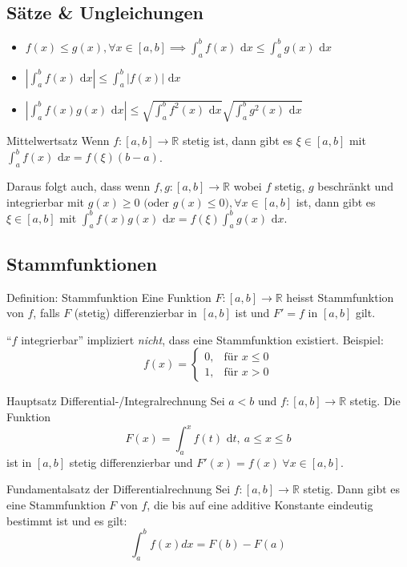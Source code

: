 \documentclass[a4paper,10pt]{article}
\def\R{\mathbb{R}}
\def\dx{\text{ d}x}
\begin{document}
\subsection{Sätze \& Ungleichungen}
\begin{itemize}
 \item $f(x) \le g(x), \forall x \in [a,b] \implies \int_a^b f(x) \dx \le \int_a^b g(x) \dx$
 \item $\left|\int_a^b f(x) \dx\right| \le \int_a^b |f(x)| \dx$
 \item $\left|\int_a^b f(x) g(x) \dx \right| \le \sqrt{\int_a^b f^2(x) \dx} \sqrt{\int_a^b g^2(x) \dx}$
\end{itemize}

\begin{mainbox}{Mittelwertsatz}
 Wenn $f: [a,b] \to \R$ stetig ist, dann gibt es $\xi \in [a,b]$ mit $\int_a^b f(x) \dx = f(\xi) (b-a)$.
\end{mainbox}
Daraus folgt auch, dass wenn $f,g: [a,b] \to \R$ wobei $f$ stetig, $g$ beschränkt und integrierbar mit $g(x) \ge 0 \text{ (oder }g(x) \le 0\text{)}, \forall x \in [a,b]$ ist, dann gibt es $\xi \in [a,b]$ mit $\int_a^b f(x)g(x) \dx = f(\xi) \int_a^b g(x) \dx$.

\subsection{Stammfunktionen}
\begin{subbox}{Definition: Stammfunktion}
 Eine Funktion $F: [a,b] \to \R$ heisst Stammfunktion von $f$, falls $F$ (stetig) differenzierbar in $[a,b]$ ist und $F' = f$ in $[a,b]$ gilt.
\end{subbox}
``$f$ integrierbar'' impliziert \textit{nicht}, dass eine Stammfunktion existiert. Beispiel:
$$
 f(x) = \begin{cases}
        0, & \text{für } x \le 0 \\
        1, & \text{für } x > 0
        \end{cases}
$$

\begin{mainbox}{Hauptsatz Differential-/Integralrechnung}
 Sei $a<b$ und $f: [a,b] \to \R$ stetig. Die Funktion 
 $$F(x) = \int_a^x f(t) \text{ d}t, \ a \le x \le b$$
 ist in $[a,b]$ stetig differenzierbar und $F'(x) = f(x) \ \forall x \in [a,b]$.
\end{mainbox}

\begin{mainbox}{Fundamentalsatz der Differentialrechnung}
  Sei $f: [a, b] \to \mathbb{R}$ stetig. Dann gibt es eine Stammfunktion $F$ von $f$, die bis auf eine additive Konstante eindeutig bestimmt ist und es gilt:
  $$\int_{a}^{b} f(x)dx = F(b) - F(a)$$
\end{mainbox}
\end{document}
